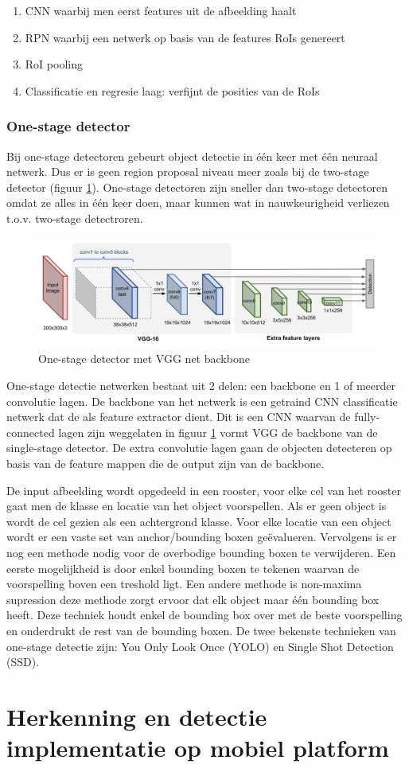 \begin{enumerate}
    \item CNN waarbij men eerst features uit de afbeelding haalt
    \item RPN waarbij een netwerk op basis van de features RoIs genereert
    \item RoI pooling 
    \item Classificatie en regresie laag: verfijnt de posities van de RoIs
\end{enumerate}

\subsection{One-stage detector}
Bij one-stage detectoren gebeurt object detectie in \'e\'en keer met \'e\'en neuraal netwerk. Dus er is geen region proposal niveau meer zoals bij de two-stage detector (figuur \ref{fig:ssd}). One-stage detectoren zijn sneller dan two-stage detectoren omdat ze alles in \'e\'en keer doen, maar kunnen wat in nauwkeurigheid verliezen t.o.v. two-stage detectroren.

\begin{figure}[!ht]
 	\centering
 	\includegraphics[width=0.80\linewidth]{fig/SSD.png}
 	\caption{One-stage detector met VGG net backbone}
 	\label{fig:ssd}
\end{figure}
 
One-stage detectie netwerken bestaat uit 2 delen: een backbone en 1 of meerder convolutie lagen. De backbone van het netwerk is een getraind CNN classificatie netwerk dat de als feature extractor dient. Dit is een CNN waarvan de fully-connected lagen zijn weggelaten in figuur \ref{fig:ssd} vormt VGG de backbone van de single-stage detector. De extra convolutie lagen gaan de objecten detecteren op basis van de feature mappen die de output zijn van de backbone. 

De input afbeelding wordt opgedeeld in een rooster, voor elke cel van het rooster gaat men de klasse en locatie van het object voorspellen. Als er geen object is wordt de cel gezien als een achtergrond klasse. Voor elke locatie van een object wordt er een vaste set van anchor/bounding boxen ge\"evalueren. Vervolgens is er nog een methode nodig voor de overbodige bounding boxen te verwijderen. Een eerste mogelijkheid is door enkel bounding boxen te tekenen waarvan de voorspelling boven een treshold ligt. Een andere methode is non-maxima supression deze methode zorgt ervoor dat elk object maar \'e\'en bounding box heeft.  Deze techniek houdt enkel de bounding box over met de beste voorspelling en onderdrukt de rest van de bounding boxen. 
De twee bekenste technieken van one-stage detectie zijn: You Only Look Once (YOLO) en Single Shot Detection (SSD).

\chapter{Herkenning en detectie implementatie op mobiel platform}
